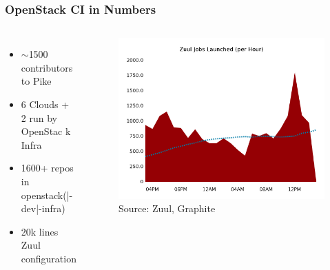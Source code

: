 \documentclass[aspectratio=169,11pt,hyperref={colorlinks=true}]{beamer}
\begin{document}
\begin{frame}
    \frametitle{OpenStack CI in Numbers}
       \begin{columns}
    \begin{itemize}
        \item{$\sim$1500 contributors to Pike}
        \item{6 Clouds + 2 run by OpenStac	k Infra}
        \item{1600+ repos in openstack(|-dev|-infra)}
        \item{20k lines Zuul configuration}
    \end{itemize}
    \begin{figure}
    \begin{center}
    	\includegraphics[width=1\textwidth]{zuul_all_jobs.png}
         \caption{Source: Zuul, Graphite}
    \end{center}
    \end{figure}
       \end{columns}
\end{frame}

\end{document}
